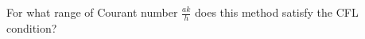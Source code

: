 For what range of Courant number $\frac{ak}{h}$ does this method satisfy the CFL condition?

\begin{solution}\ \\\\
    \hfill\vfill
    \ \\
\end{solution}